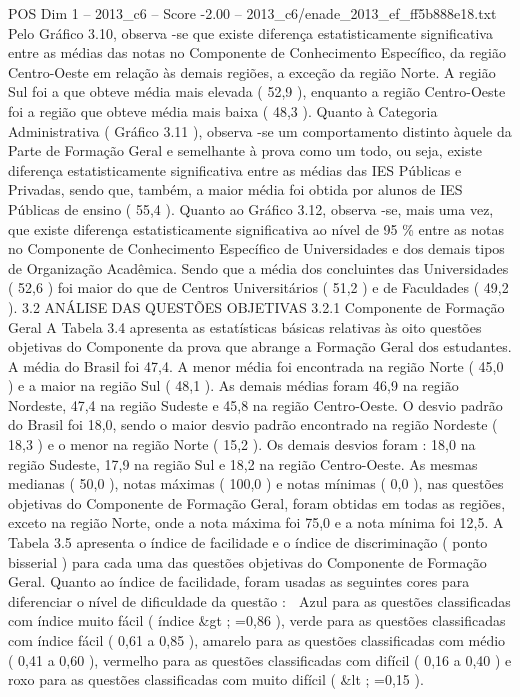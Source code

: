 \begin{textsample}{POS Dim 1 – 2013\_c6 – Score -2.00 – 2013\_c6/enade\_2013\_ef\_ff5b888e18.txt}
Pelo Gráfico 3.10, observa -se que existe diferença estatisticamente significativa entre as médias das notas no Componente de Conhecimento Específico, da região Centro-Oeste em relação às demais regiões, a exceção da região Norte.
A região Sul foi a que obteve média mais elevada ( 52,9 ), enquanto a região Centro-Oeste foi a região que obteve média mais baixa ( 48,3 ).
Quanto à Categoria Administrativa ( Gráfico 3.11 ), observa -se um comportamento distinto àquele da Parte de Formação Geral e semelhante à prova como um todo, ou seja, existe diferença estatisticamente significativa entre as médias das IES Públicas e Privadas, sendo que, também, a maior média foi obtida por alunos de IES Públicas de ensino ( 55,4 ).
Quanto ao Gráfico 3.12, observa -se, mais uma vez, que existe diferença estatisticamente significativa ao nível de 95 \% entre as notas no Componente de Conhecimento Específico de Universidades e dos demais tipos de Organização Acadêmica.
Sendo que a média dos concluintes das Universidades ( 52,6 ) foi maior do que de Centros Universitários ( 51,2 ) e de Faculdades ( 49,2 ). 3.2 ANÁLISE DAS QUESTÕES OBJETIVAS 3.2.1 Componente de Formação Geral A Tabela 3.4 apresenta as estatísticas básicas relativas às oito questões objetivas do Componente da prova que abrange a Formação Geral dos estudantes.
A média do Brasil foi 47,4.
A menor média foi encontrada na região Norte ( 45,0 ) e a maior na região Sul ( 48,1 ).
As demais médias foram 46,9 na região Nordeste, 47,4 na região Sudeste e 45,8 na região Centro-Oeste.
O desvio padrão do Brasil foi 18,0, sendo o maior desvio padrão encontrado na região Nordeste ( 18,3 ) e o menor na região Norte ( 15,2 ).
Os demais desvios foram : 18,0 na região Sudeste, 17,9 na região Sul e 18,2 na região Centro-Oeste.
As mesmas medianas ( 50,0 ), notas máximas ( 100,0 ) e notas mínimas ( 0,0 ), nas questões objetivas do Componente de Formação Geral, foram obtidas em todas as regiões, exceto na região Norte, onde a nota máxima foi 75,0 e a nota mínima foi 12,5.
A Tabela 3.5 apresenta o índice de facilidade e o índice de discriminação ( ponto bisserial ) para cada uma das questões objetivas do Componente de Formação Geral.
Quanto ao índice de facilidade, foram usadas as seguintes cores para diferenciar o nível de dificuldade da questão :  Azul para as questões classificadas com índice muito fácil ( índice \&gt ; =0,86 ), verde para as questões classificadas com índice fácil ( 0,61 a 0,85 ), amarelo para as questões classificadas com médio ( 0,41 a 0,60 ), vermelho para as questões classificadas com difícil ( 0,16 a 0,40 ) e roxo para as questões classificadas com muito difícil ( \&lt ; =0,15 ).

\end{textsample}
